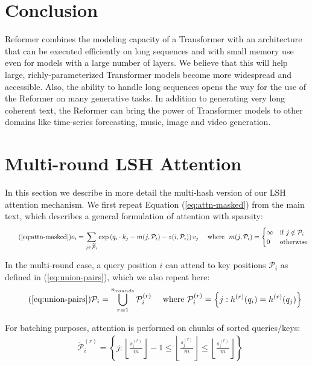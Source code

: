 \documentclass{article} %
\def\pair{\mathcal{P}}
\def\extpair{\widetilde{\mathcal{P}}}
\begin{document}
\section{Conclusion}

Reformer combines the modeling capacity of a Transformer with an architecture that can be executed efficiently on long sequences and with small memory
use even for models with a large number of layers.
We believe that this will help large, richly-parameterized Transformer models become more widespread and accessible. 
Also, the ability to handle long sequences opens the way for the use of
the Reformer on many generative tasks. In addition to generating very long
coherent text, the Reformer can bring the power of Transformer models to other
domains like time-series forecasting, music, image and video generation.




\newpage
\appendix
\section{Multi-round LSH Attention} \label{sec:multi-round-detail}

In this section we describe in more detail the multi-hash version of our LSH attention mechanism. We first repeat Equation (\ref{eq:attn-masked}) from the main text, which describes a general formulation of attention with sparsity:
\begin{equation*} \tag{\ref{eq:attn-masked}}
    o_i = \sum_{j \in \extpair_i} \exp \left(q_i \cdot k_j - m(j, \pair_i) - z(i, \pair_i) \right) v_j \quad
    \text{ where } \ m(j, \pair_i) = \begin{cases}
    \infty & \text{if } j \notin \pair_i\\
    0 & \text{otherwise}
    \end{cases}
\end{equation*}

In the multi-round case, a query position $i$ can attend to key positions $\pair_i$ as defined in (\ref{eq:union-pairs}), which we also repeat here:
\begin{align*} \tag{\ref{eq:union-pairs}}
    &\pair_i = \bigcup_{r=1}^{n_{rounds}} \pair^{(r)}_i
    & \text{ where } \pair^{(r)}_i = \left\{ j : h^{(r)}(q_i) = h^{(r)}(q_j) \right\}
\end{align*}

For batching purposes, attention is performed on chunks of sorted queries/keys:
\begin{align}
    &\extpair^{(r)}_i = \left\{ j : \left\lfloor \frac{s^{(r)}_i}{m}\right\rfloor - 1 \leq \left\lfloor \frac{s^{(r)}_j}{m}\right\rfloor \leq  \left\lfloor \frac{s^{(r)}_i}{m}\right\rfloor \right\}
\end{align}
\end{document}
